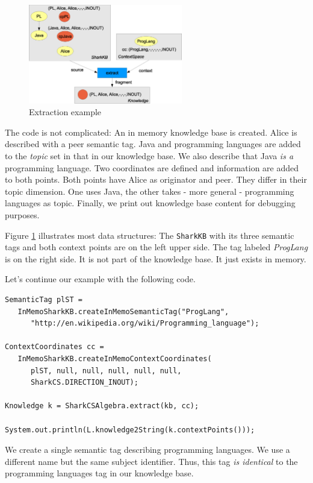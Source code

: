 \begin{figure}[t]
\centering
\includegraphics[width=0.60\textwidth]{extraction.eps}
\caption{Extraction example}
\label{fig:extraction}
\end{figure}

The code is not complicated:
An in memory knowledge base is created. Alice is described with a peer semantic tag. Java and programming languages are added to the {\it topic} set in that in our knowledge base. We also describe that Java {\it is a} programming language. Two coordinates are defined and information are added to both points. Both points have Alice as originator and peer. They differ in their topic dimension. One uses Java, the other takes - more general - programming languages as topic. Finally, we print out knowledge base content for debugging purposes. 

Figure \ref{fig:extraction} illustrates most data structures: The {\tt SharkKB} with its three semantic tags and both context points are on the left upper side. 
The tag labeled {\it ProgLang} is on the right side. It is not part of the knowledge base. It just exists in memory.

Let's continue our example with the following code.

\begin{verbatim}
SemanticTag plST = 
   InMemoSharkKB.createInMemoSemanticTag("ProgLang", 
      "http://en.wikipedia.org/wiki/Programming_language");

ContextCoordinates cc = 
   InMemoSharkKB.createInMemoContextCoordinates(
      plST, null, null, null, null, null, 
      SharkCS.DIRECTION_INOUT);

Knowledge k = SharkCSAlgebra.extract(kb, cc);

System.out.println(L.knowledge2String(k.contextPoints()));
\end{verbatim}

We create a single semantic tag describing programming languages. 
We use a different name but the same subject identifier. Thus, this 
tag {\it is identical} to the programming languages tag in our knowledge base.

